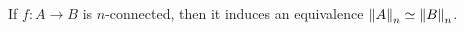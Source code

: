\documentclass[hott-all.tex]{subfiles}
\begin{document}
% 
% 
\begin{lem} 
If $f : A \to B$ is $n$-connected, then it induces an equivalence
$\eqv{\trunc{n}{A}}{\trunc{n}{B}}$.
\end{lem}
% 
% 
% 
% 
% 
% 
% 
\end{document}

